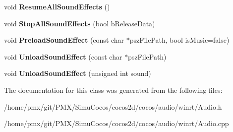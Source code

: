 \begin{DoxyCompactItemize}
\mbox{\label{classAudio_a05c919f64f2b5ad31e624a1a0dee4c75}} 
void {\bfseries Resume\+All\+Sound\+Effects} ()
\item 
\mbox{\label{classAudio_a847f4085b2427fc350407af398e08ee8}} 
void {\bfseries Stop\+All\+Sound\+Effects} (bool b\+Release\+Data)
\item 
\mbox{\label{classAudio_a98a5364325e02d295b660606b9b8955e}} 
void {\bfseries Preload\+Sound\+Effect} (const char $\ast$psz\+File\+Path, bool is\+Music=false)
\item 
\mbox{\label{classAudio_ad8b721bdab612fac8598fce1a9243d7a}} 
void {\bfseries Unload\+Sound\+Effect} (const char $\ast$psz\+File\+Path)
\item 
\mbox{\label{classAudio_ad6f98b0ed6916b5ed29ec16129dce89c}} 
void {\bfseries Unload\+Sound\+Effect} (unsigned int sound)
\end{DoxyCompactItemize}


The documentation for this class was generated from the following files\+:\begin{DoxyCompactItemize}
\item 
/home/pmx/git/\+P\+M\+X/\+Simu\+Cocos/cocos2d/cocos/audio/winrt/Audio.\+h\item 
/home/pmx/git/\+P\+M\+X/\+Simu\+Cocos/cocos2d/cocos/audio/winrt/Audio.\+cpp\end{DoxyCompactItemize}
